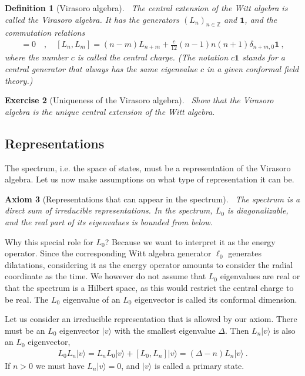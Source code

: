 \documentclass[12pt, a4paper]{article}
\theoremstyle{break}
\newtheorem{exo}{Exercise}[section]
\newtheorem{hyp}[exo]{Axiom}
\newtheorem{defn}[exo]{Definition}
\begin{document}
\begin{defn}[Virasoro algebra]
 ~\label{def:vir}
 The central extension of the Witt algebra is called the Virasoro algebra. It has the generators $(L_n)_{n\in\mathbb{Z}}$ and $\mathbf 1$, and the commutation relations
 \begin{align}
  [\mathbf 1, L_n] = 0 \quad , \quad [L_n,L_m] = (n-m)L_{n+m} +\frac{c}{12}(n-1)n(n+1)\delta_{n+m,0}\mathbf 1 \ ,
  \label{eq:vir}
 \end{align}
 where the number $c$ is called the central charge. (The notation $c\mathbf 1$ stands for a central generator that always has the same eigenvalue $c$ in a given conformal field theory.)
\end{defn}

\begin{exo}[Uniqueness of the Virasoro algebra]
 ~\label{exo:vir}
 Show that the Virasoro algebra is the unique central extension of the Witt algebra.
\end{exo}


\subsection{Representations}

The spectrum, i.e. the space of states, must be a representation of the Virasoro algebra. Let us now make assumptions on what type of representation it can be.

\begin{hyp}[Representations that can appear in the spectrum]
 ~\label{hyp:rep}
 The spectrum is a direct sum of irreducible representations. In the spectrum, $L_0$ is diagonalizable, and the real part of its eigenvalues is bounded from below.
\end{hyp}

Why this special role for $L_0$? Because we want to interpret it as the energy operator. Since the corresponding Witt algebra generator $\ell_0$ generates dilatations, considering it as the energy operator amounts to consider the radial coordinate as the time. We however do not assume that $L_0$ eigenvalues are real or that the spectrum is a Hilbert space, as this would restrict the central charge to be real. The $L_0$ eigenvalue of an $L_0$ eigenvector is called its conformal dimension.

Let us consider an irreducible representation that is allowed by our axiom. There must be an $L_0$ eigenvector $|v\rangle$ with the smallest eigenvalue $\Delta$. Then $L_n|v\rangle$ is also an $L_0$ eigenvector,
\begin{align}
 L_0 L_n|v\rangle = L_nL_0|v\rangle + [L_0, L_n] |v\rangle  = (\Delta-n)L_n|v\rangle \ .
\end{align}
If $n>0$ we must have $L_n|v\rangle =0$, and $|v\rangle $ is called a primary state.
\end{document}
